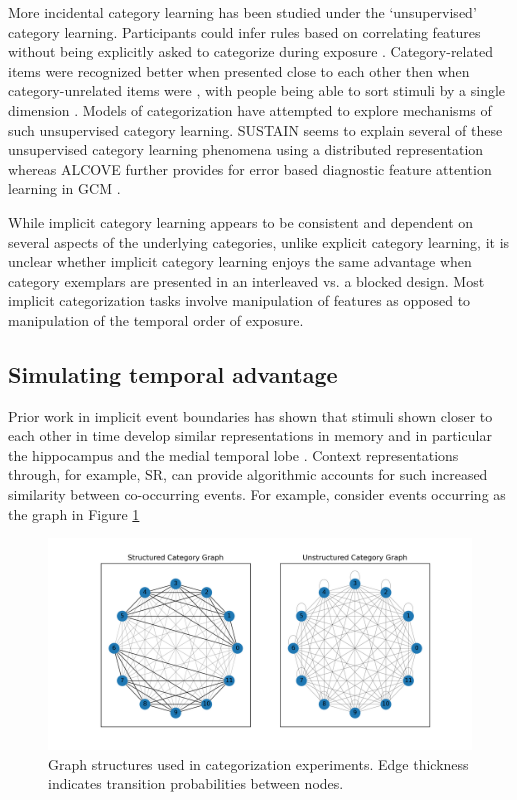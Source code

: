 More incidental category learning has been studied under the `unsupervised' category learning. Participants could infer rules based on correlating features without being explicitly asked to categorize during exposure \parencite{billman1996unsupervised}. Category-related items were recognized better when presented close to each other then when category-unrelated items were \parencite{medin1994presentation}, with people being able to sort stimuli by a single dimension \parencite{medin1987family}. Models of categorization have attempted to explore mechanisms of such unsupervised category learning.  SUSTAIN \parencite{love2004sustain} seems to explain several of these unsupervised category learning phenomena using a distributed representation whereas ALCOVE \parencite{kruschke2020alcove} further provides for error based diagnostic feature attention learning in GCM \parencite{nosofsky2011generalized, nosofsky1986attention}.

While implicit category learning appears to be consistent and dependent on several aspects of the underlying categories, unlike explicit category learning, it is unclear whether implicit category learning enjoys the same advantage when category exemplars are presented in an interleaved vs. a blocked design. Most implicit categorization tasks involve manipulation of features as opposed to manipulation of the temporal order of exposure. 

\subsection{Simulating temporal advantage}

Prior work in implicit event boundaries has shown that stimuli shown closer to each other in time develop similar representations in memory and in particular the hippocampus and the medial temporal lobe \parencite{schapiro2013neural, turk2019hippocampus, bonner2021object}. Context representations through, for example, SR, can provide algorithmic accounts for such increased similarity between co-occurring events. For example, consider events occurring as the graph in Figure \ref{fig:category-graph-structures}

\begin{figure}[ht]
    \centering
    \includegraphics[width = \textwidth]{chapter_notebooks/chapter_4/figures/cat_graphs.png}
    \caption{Graph structures used in categorization experiments. Edge thickness indicates transition probabilities between nodes.}
    \label{fig:category-graph-structures}
\end{figure}

